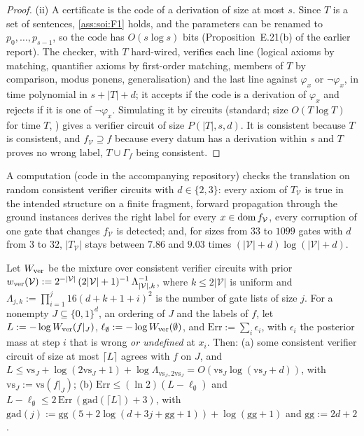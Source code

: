 \begin{proof}
(ii) A certificate is the code of a derivation of size at most $s$. Since $T$ is a set of sentences, \cref{ass:soi:F1} holds, and the parameters can be renamed to $p_0,\dots,p_{s-1}$, so the code has $O(s\log s)$ bits (Proposition~E.21(b) of the earlier report). The checker, with $T$ hard-wired, verifies each line (logical axioms by matching, quantifier axioms by first-order matching, members of $T$ by comparison, modus ponens, generalisation) and the last line against $\varphi_x$ or $\neg\varphi_x$, in time polynomial in $s+\lvert T\rvert+d$; it accepts if the code is a derivation of $\varphi_x$ and rejects if it is one of $\neg\varphi_x$. Simulating it by circuits (standard; size $O(T\log T)$ for time $T$, \citealp{pippenger1979relations}) gives a verifier circuit of size $P(\lvert T\rvert,s,d)$. It is consistent because $T$ is consistent, and $f_{\mathcal V}\supseteq f$ because every datum has a derivation within $s$ and $T$ proves no wrong label, $T\cup\Gamma_f$ being consistent.
\end{proof}

A computation (code in the accompanying repository) checks the translation on random consistent verifier circuits with $d\in\{2,3\}$: every axiom of $T_{\mathcal V}$ is true in the intended structure on a finite fragment, forward propagation through the ground instances derives the right label for every $x\in\operatorname{dom} f_{\mathcal V}$, every corruption of one gate that changes $f_{\mathcal V}$ is detected; and, for sizes from $33$ to $1099$ gates with $d$ from $3$ to $32$, $\lvert T_{\mathcal V}\rvert$ stays between $7.86$ and $9.03$ times $(\lvert\mathcal V\rvert+d)\log(\lvert\mathcal V\rvert+d)$.

\begin{corollary}\label{cor:soi:circuitBayes}
Let $W_{\rm ver}$ be the mixture over consistent verifier circuits with prior $w_{\rm ver}(\mathcal V):=2^{-\lvert\mathcal V\rvert}\,(2\lvert\mathcal V\rvert+1)^{-1}\,\Lambda_{\lvert\mathcal V\rvert,k}^{-1}$, where $k\le2\lvert\mathcal V\rvert$ is uniform and $\Lambda_{j,k}:=\prod_{i=1}^{j}16(d+k+1+i)^2$ is the number of gate lists of size $j$. For a nonempty $J\subseteq\{0,1\}^d$, an ordering of $J$ and the labels of $f$, let $L:=-\log W_{\rm ver}(f|_J)$, $\ell_\emptyset:=-\log W_{\rm ver}(\emptyset)$, and $\mathrm{Err}:=\sum_i\epsilon_i$, with $\epsilon_i$ the posterior mass at step $i$ that is wrong \emph{or undefined} at $x_i$. Then:
(a) some consistent verifier circuit of size at most $\lceil L\rceil$ agrees with $f$ on $J$, and $L\le\mathrm{vs}_J+\log(2\mathrm{vs}_J+1)+\log\Lambda_{\mathrm{vs}_J,2\mathrm{vs}_J}=O(\mathrm{vs}_J\log(\mathrm{vs}_J+d))$, with $\mathrm{vs}_J:=\mathrm{vs}(f|_J)$;
(b) $\mathrm{Err}\le(\ln2)(L-\ell_\emptyset)$ and $L-\ell_\emptyset\le2\,\mathrm{Err}\,(\mathrm{gad}(\lceil L\rceil)+3)$, with $\mathrm{gad}(j):=\mathrm{gg}\,(5+2\log(d+3j+\mathrm{gg}+1))+\log(\mathrm{gg}+1)$ and $\mathrm{gg}:=2d+2$.
\end{corollary}

